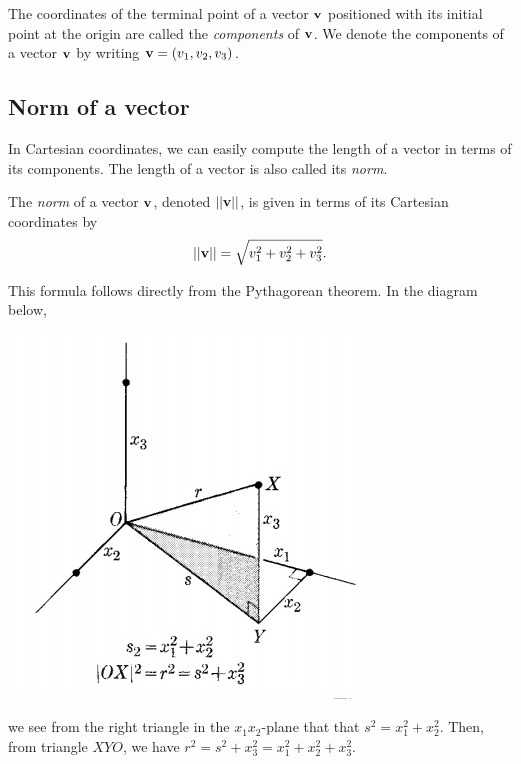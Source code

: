 \documentclass[12pt,letterpaper,reqno]{article}
\numberwithin{equation}{section}
\newcommand{\ti}[1]{\textit{#1}}
\begin{document}
\begin{defn}
	The coordinates of the terminal point of a vector ${\bf v}$ positioned with its initial point at the origin are called the \ti{components} of ${\bf v}$. We denote the components of a vector ${\bf v}$ by writing ${\bf v}=(v_1,v_2,v_3)$.
\end{defn}

\subsection{Norm of a vector}
In Cartesian coordinates, we can easily compute the length of a vector in terms of its components. The length of a vector is also called its \ti{norm}. 
\begin{defn}\label{def:length_of_a_vector}
	The \ti{norm} of a vector ${\bf v}$, denoted $||{\bf v}||$, is given in terms of its Cartesian coordinates by
	\begin{align*}
		||{\bf v}||=\sqrt{v_1^2+v_2^2+v_3^2}.
	\end{align*}
\end{defn}

\begin{pf}
This formula follows directly from the Pythagorean theorem. In the diagram below,
\begin{center}
	\includegraphics[scale=0.5]{figures_mvc/euclidean_norm}
\end{center}	
we see from the right triangle in the $x_1x_2$-plane that that $s^2=x_1^2+x_2^2$. Then, from triangle $XYO$, we have $r^2=s^2+x_3^2=x_1^2+x_2^2+x_3^2$.
\end{pf}
\end{document}
